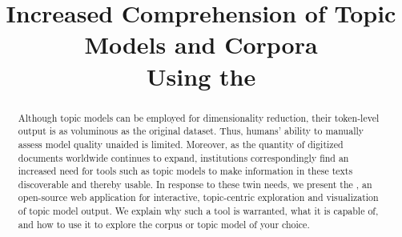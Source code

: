 \documentclass[11pt]{article}
\title{Increased Comprehension of Topic Models and Corpora\\ Using the \tool}
\begin{document}
\maketitle


\begin{abstract}
Although topic models can be employed for dimensionality reduction, their
token-level output is as voluminous as the original dataset. Thus, humans'
ability to manually assess model quality unaided is limited. Moreover, as the quantity of
digitized documents worldwide continues to expand, institutions correspondingly
find an increased need for tools such as topic models to make information in
these texts discoverable and thereby usable. In response to these twin needs, we
present the \tool, an open-source web application for interactive, topic-centric
exploration and visualization of topic model output. We explain why such a tool
is warranted, what it is capable of, and how to use it to explore the corpus or
topic model of your choice.
\end{abstract}
\end{document}
